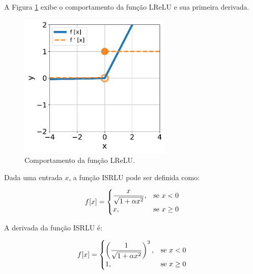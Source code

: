A Figura \ref{fig:ann_lrelu_function} exibe o comportamento da função LReLU \citep{maas2013rectifier} e sua primeira derivada.

\begin{figure}[H]
    \centering
    \includegraphics[width=0.65\textwidth]{figs/ann_lrelu_function.pdf}

    \caption{Comportamento da função LReLU.}
    \label{fig:ann_lrelu_function}
\end{figure}


\linebreak
\newpage


\begin{definition}
    Dada uma entrada $x$, a função ISRLU pode ser definida como:

    \begin{equation}
        f[x] = 
        \begin{cases}
            \dfrac{x}{\sqrt{1 + \alpha x^{2}}}, & \text{se $x < 0$}\\
            x, & \text{se $x \geq 0$}
        \end{cases}
        \vspace{0.2cm}
        \label{eq:ann_isrlu_function}
    \end{equation}

    A derivada da função ISRLU é:

    \begin{equation}
        f[x] = 
        \begin{cases}
            \left(\dfrac{1}{\sqrt{1 + \alpha x^{2}}}\right)^{3}, & \text{se $x < 0$}\\
            1, & \text{se $x \geq 0$}
        \end{cases}
        \vspace{0.2cm}
        \label{eq:ann_isrlu_function_dy}
    \end{equation}

\end{definition}

